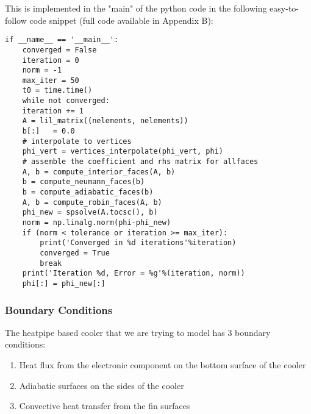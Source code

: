 \documentclass[11pt]{article}
\begin{document}
This is implemented in the "main" of the python code in the following easy-to-follow code snippet (full code available in Appendix B):
\begin{verbatim}
if __name__ == '__main__':
    converged = False
    iteration = 0
    norm = -1
    max_iter = 50
    t0 = time.time()
    while not converged:
	iteration += 1
	A = lil_matrix((nelements, nelements))
	b[:]   = 0.0
	# interpolate to vertices
	phi_vert = vertices_interpolate(phi_vert, phi)  
	# assemble the coefficient and rhs matrix for allfaces
	A, b = compute_interior_faces(A, b)
	b = compute_neumann_faces(b)
	b = compute_adiabatic_faces(b)
	A, b = compute_robin_faces(A, b)
	phi_new = spsolve(A.tocsc(), b)
	norm = np.linalg.norm(phi-phi_new)
	if (norm < tolerance or iteration >= max_iter):
	    print('Converged in %d iterations'%iteration)
	    converged = True
	    break
	print('Iteration %d, Error = %g'%(iteration, norm))
	phi[:] = phi_new[:]
\end{verbatim}

\subsubsection{Boundary Conditions}
\label{sec:orga301617}
The heatpipe based cooler that we are trying to model has 3 boundary conditions:
\begin{enumerate}
\item Heat flux from the electronic component on the bottom surface of the cooler
\item Adiabatic surfaces on the sides of the cooler
\item Convective heat transfer from the fin surfaces
\end{enumerate}
\end{document}

